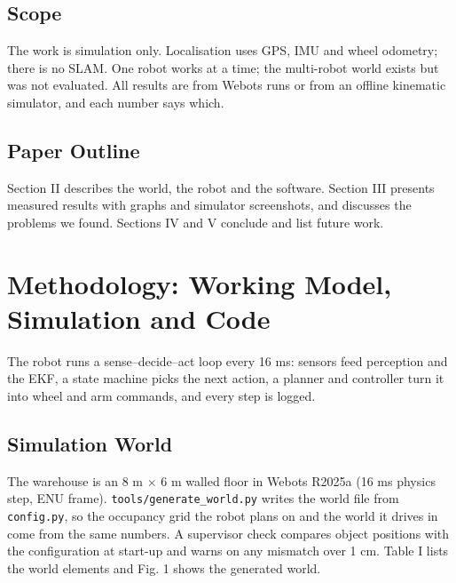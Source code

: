 \documentclass[conference]{IEEEtran}
\begin{document}
\subsection{Scope}
The work is simulation only. Localisation uses GPS, IMU and wheel odometry; there is no SLAM. One robot works at a time; the multi-robot world exists but was not evaluated. All results are from Webots runs or from an offline kinematic simulator, and each number says which.

\subsection{Paper Outline}
Section II describes the world, the robot and the software. Section III presents measured results with graphs and simulator screenshots, and discusses the problems we found. Sections IV and V conclude and list future work.

\section{Methodology: Working Model, Simulation and Code}
The robot runs a sense--decide--act loop every 16 ms: sensors feed perception and the EKF, a state machine picks the next action, a planner and controller turn it into wheel and arm commands, and every step is logged.

\subsection{Simulation World}
The warehouse is an 8 m $\times$ 6 m walled floor in Webots R2025a (16 ms physics step, ENU frame). \texttt{tools/generate\_\allowbreak{}world.py} writes the world file from \texttt{config.py}, so the occupancy grid the robot plans on and the world it drives in come from the same numbers. A supervisor check compares object positions with the configuration at start-up and warns on any mismatch over 1 cm. Table I lists the world elements and Fig. 1 shows the generated world.
\end{document}
